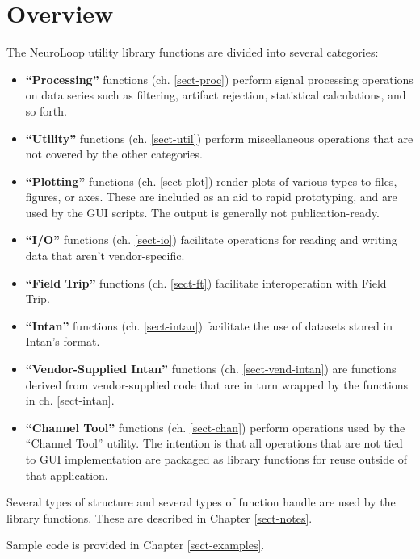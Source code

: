 
\chapter{Overview}
\label{sect-over}

The NeuroLoop utility library functions are divided into several categories:

\begin{itemize}

\item \textbf{``Processing''} functions (ch. \ref{sect-proc}) perform signal
processing operations on data series such as filtering, artifact rejection,
statistical calculations, and so forth.

\item \textbf{``Utility''} functions (ch. \ref{sect-util}) perform
miscellaneous operations that are not covered by the other categories.

\item \textbf{``Plotting''} functions (ch. \ref{sect-plot}) render plots
of various types to files, figures, or axes. These are included as an aid
to rapid prototyping, and are used by the GUI scripts. The output is
generally not publication-ready.

\item \textbf{``I/O''} functions (ch. \ref{sect-io}) facilitate operations
for reading and writing data that aren't vendor-specific.

\item \textbf{``Field Trip''} functions (ch. \ref{sect-ft}) facilitate
interoperation with Field Trip.

\item \textbf{``Intan''} functions (ch. \ref{sect-intan}) facilitate the use
of datasets stored in Intan's format.

\item \textbf{``Vendor-Supplied Intan''} functions
(ch. \ref{sect-vend-intan}) are functions derived from vendor-supplied code
that are in turn wrapped by the functions in ch. \ref{sect-intan}.

\item \textbf{``Channel Tool''} functions (ch. \ref{sect-chan}) perform
operations used by the ``Channel Tool'' utility. The intention is that all
operations that are not tied to GUI implementation are packaged as library
functions for reuse outside of that application.

\end{itemize}

Several types of structure and several types of function handle are used by
the library functions. These are described in Chapter \ref{sect-notes}.

Sample code is provided in Chapter \ref{sect-examples}.

%
